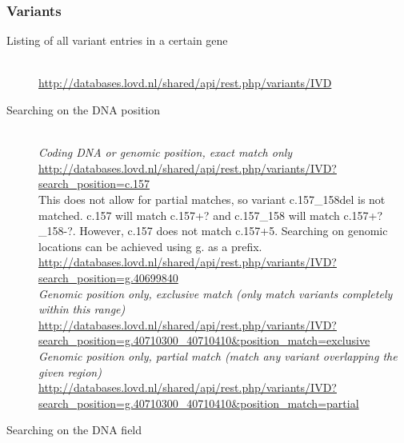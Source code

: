 \subsubsection{Variants}
\begin{description}
  \item[Listing of all variant entries in a certain gene]\hfill \\
  \href{http://databases.lovd.nl/shared/api/rest.php/variants/IVD}
       {http://databases.lovd.nl/shared/api/rest.php/variants/IVD}
  \item[Searching on the DNA position]\hfill \\
  \emph{Coding DNA or genomic position, exact match only}\\
  \href{http://databases.lovd.nl/shared/api/rest.php/variants/IVD?search_position=c.157}
       {http://databases.lovd.nl/shared/api/rest.php/variants/IVD?search\_position=c.157}\\
       This does not allow for partial matches, so variant c.157\_158del is not matched.
       c.157 will match c.157+? and c.157\_158 will match c.157+?\_158-?.
       However, c.157 does not match c.157+5.
       Searching on genomic locations can be achieved using g. as a prefix.\\
       \small{
       \href{http://databases.lovd.nl/shared/api/rest.php/variants/IVD?search_position=g.40699840}
            {http://databases.lovd.nl/shared/api/rest.php/variants/IVD?search\_position=g.40699840}}\\
  \emph{Genomic position only, exclusive match (only match variants completely within this range)}\\
  \href{http://databases.lovd.nl/shared/api/rest.php/variants/IVD?search_position=g.40710300_40710410&position_match=exclusive}
       {http://databases.lovd.nl/shared/api/rest.php/variants/IVD?\\
       \phantom{..........}search\_position=g.40710300\_40710410\&position\_match=exclusive}\\
  \emph{Genomic position only, partial match (match any variant overlapping the given region)}\\
  \href{http://databases.lovd.nl/shared/api/rest.php/variants/IVD?search_position=g.40710300_40710410&position_match=partial}
       {http://databases.lovd.nl/shared/api/rest.php/variants/IVD?\\
       \phantom{..........}search\_position=g.40710300\_40710410\&position\_match=partial}
  \item[Searching on the DNA field]\hfill \\

\end{description}
